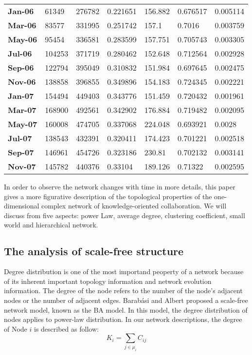 \documentclass{elsarticle}
\begin{document}
\begin{table}[htbp]
\begin{tabular}{lllllll}
    {\bf Jan-06} & 61349 & 276782 & 0.221651 & 156.882 & 0.676517 & 0.005114 \\
    {\bf Mar-06} & 83577 & 331995 & 0.251742 & 157.1 & 0.7016 & 0.003759 \\
    {\bf May-06} & 95454 & 336581 & 0.283599 & 157.751 & 0.705743 & 0.003305 \\
    {\bf Jul-06} & 104253 & 371719 & 0.280462 & 152.648 & 0.712564 & 0.002928 \\
    {\bf Sep-06} & 122794 & 395049 & 0.310832 & 151.984 & 0.697645 & 0.002475 \\
    {\bf Nov-06} & 138858 & 396855 & 0.349896 & 154.183 & 0.724345 & 0.002221 \\
    {\bf Jan-07} & 154494 & 449403 & 0.343776 & 151.459 & 0.720432 & 0.001961 \\
    {\bf Mar-07} & 168900 & 492561 & 0.342902 & 176.884 & 0.719482 & 0.002095 \\
    {\bf May-07} & 160008 & 474705 & 0.337068 & 224.048 & 0.693921 & 0.0028 \\
    {\bf Jul-07} & 138543 & 432391 & 0.320411 & 174.423 & 0.701221 & 0.002518 \\
    {\bf Sep-07} & 146961 & 454726 & 0.323186 & 230.81 & 0.702132 & 0.003141 \\
    {\bf Nov-07} & 145782 & 440376 & 0.33104 & 189.126 & 0.71322 & 0.002595 \\\bottomrule
       \end{tabular}
  \label{tab:addlabel}
\end{table}
In order to observe the network changes with time in more details,
this paper gives a more figurative description of the topological
properties of the one-dimensional complex network of
knowledge-oriented collaboration. We will discuss from five aspects: power Law, average degree, clustering coefficient, small world and hierarchical network.

\subsection{The analysis of scale-free structure}
\label{sec:analysis-scale-free}

Degree distribution is one of the most
importand peoperty of a network because of its inherent important
topology information and network evolution information.   The degree of
the node refers to the number of the node's adjacent nodes or the
number of adjacent edges.  Barabási and
Albert proposed a scale-free network model, known as the BA
model\cite{barabasi1999esr}. In this model,  the degree distribution of nodes   applies to power-law distribution.  In our network descriptions, the degree of Node $i$ is described as follow: 
\begin{equation}
  K_i=\sum_{j\in\mu_i}C_{ij}
\end{equation}
\end{document}
